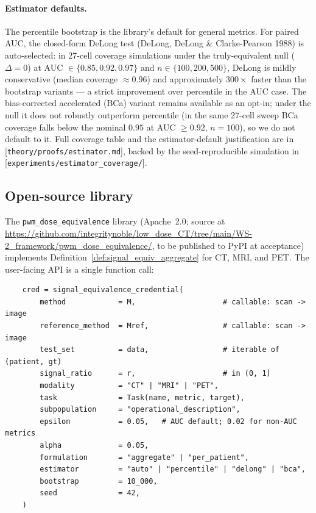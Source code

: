 \documentclass[twoside,11pt]{article}
\begin{document}
\paragraph{Estimator defaults.} The percentile bootstrap is the library's default for general metrics. For paired AUC, the closed-form DeLong test (DeLong, DeLong \& Clarke-Pearson 1988) is auto-selected: in 27-cell coverage simulations under the truly-equivalent null ($\Delta = 0$) at AUC $\in \{0.85, 0.92, 0.97\}$ and $n \in \{100, 200, 500\}$, DeLong is mildly conservative (median coverage $\approx 0.96$) and approximately $300\times$ faster than the bootstrap variants --- a strict improvement over percentile in the AUC case. The bias-corrected accelerated (BCa) variant remains available as an opt-in; under the null it does not robustly outperform percentile (in the same 27-cell sweep BCa coverage falls below the nominal $0.95$ at AUC $\geq 0.92$, $n = 100$), so we do not default to it. Full coverage table and the estimator-default justification are in [\texttt{theory/proofs/estimator.md}], backed by the seed-reproducible simulation in [\texttt{experiments/estimator\_coverage/}].

\subsection{Open-source library}
\label{sec:methods-library}

The \texttt{pwm\_dose\_equivalence} library (Apache~2.0; source at \url{https://github.com/integritynoble/low_dose_CT/tree/main/WS-2_framework/pwm_dose_equivalence/}, to be published to PyPI at acceptance) implements Definition~\ref{def:signal_equiv_aggregate} for CT, MRI, and PET. The user-facing API is a single function call:

\begin{verbatim}
    cred = signal_equivalence_credential(
        method            = M,                    # callable: scan -> image
        reference_method  = Mref,                 # callable: scan -> image
        test_set          = data,                 # iterable of (patient, gt)
        signal_ratio      = r,                    # in (0, 1]
        modality          = "CT" | "MRI" | "PET",
        task              = Task(name, metric, target),
        subpopulation     = "operational_description",
        epsilon           = 0.05,   # AUC default; 0.02 for non-AUC metrics
        alpha             = 0.05,
        formulation       = "aggregate" | "per_patient",
        estimator         = "auto" | "percentile" | "delong" | "bca",
        bootstrap         = 10_000,
        seed              = 42,
    )
\end{verbatim}
\end{document}
